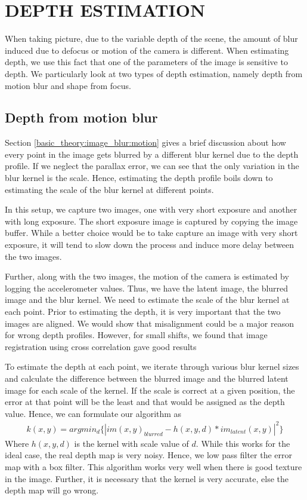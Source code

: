 \documentclass[BTech]{iitmdiss}
\begin{document}
\pagebreak
\chapter{DEPTH ESTIMATION}
\label{chap:depth_estimation}
When taking picture, due to the variable depth of the scene, the amount 
of blur induced due to defocus or motion of the camera is different. 
When estimating depth, we use this fact that one of the parameters of 
the image is sensitive to depth. We particularly look at two types of 
depth estimation, namely depth from motion blur and shape from focus.

\section{Depth from motion blur}
\label{depth_estimation:motion}
Section \ref{basic_theory:image_blur:motion} gives a brief discussion 
about how every point in the image gets blurred by a different blur 
kernel due to the depth profile. If we neglect the parallax error, we 
can see that the only variation in the blur kernel is the scale. Hence,
estimating the depth profile boils down to estimating the scale of the 
blur kernel at different points. 

In this setup, we capture two images, one with very short exposure and
another with long exposure. The short exposure image is captured by
copying the image buffer. While a better choice would be to take capture
an image with very short exposure, it will tend to slow down the process
and induce more delay between the two images. 

Further, along with the two images, the motion of the camera is 
estimated by logging the accelerometer values. Thus, we have the latent
image, the blurred image and the blur kernel. We need to estimate the 
scale of the blur kernel at each point. Prior to estimating the depth,
it is very important that the two images are aligned. We would show that
misalignment could be a major reason for wrong depth profiles. However,
for small shifts, we found that image registration using cross 
correlation gave good results

To estimate the depth at each point, we iterate through various blur
kernel sizes and calculate the difference between the blurred image and
the blurred latent image for each scale of the kernel. If the scale is
correct at a given position, the error at that point will be the least
and that would be assigned as the depth value. Hence, we can formulate
our algorithm as
\begin{align*}
k(x,y) = argmin_d\{|im(x,y)_{blurred}-h(x,y,d)*im_{latent}(x,y)|^2\}
\end{align*}
Where $h(x,y,d)$ is the kernel with scale value of $d$. While this works
for the ideal case, the real depth map is very noisy. Hence, we low pass
filter the error map with a box filter. This algorithm works very well
when there is good texture in the image. Further, it is necessary that
the kernel is very accurate, else the depth map will go wrong. 
\end{document}
